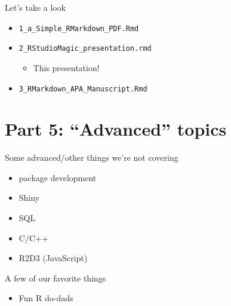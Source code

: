 \documentclass[ignorenonframetext,]{beamer}
\providecommand{\tightlist}{%
  \setlength{\itemsep}{0pt}\setlength{\parskip}{0pt}}
\begin{document}
\begin{frame}[fragile]{Let's take a look}
\protect\hypertarget{lets-take-a-look}{}

\begin{itemize}
\tightlist
\item
  \texttt{1\_a\_Simple\_RMarkdown\_PDF.Rmd}
\item
  \texttt{2\_RStudioMagic\_presentation.rmd}

  \begin{itemize}
  \tightlist
  \item
    This presentation!
  \end{itemize}
\item
  \texttt{3\_RMarkdown\_APA\_Manuscript.Rmd}
\end{itemize}

\end{frame}

\hypertarget{part-5-advanced-topics}{%
\section{Part 5: ``Advanced'' topics}\label{part-5-advanced-topics}}

\begin{frame}{Some advanced/other things we're not covering}
\protect\hypertarget{some-advancedother-things-were-not-covering}{}

\begin{itemize}
\tightlist
\item
  package development
\item
  Shiny
\item
  SQL
\item
  C/C++
\item
  R2D3 (JavaScript)
\end{itemize}

\end{frame}

\begin{frame}{A few of our favorite things}
\protect\hypertarget{a-few-of-our-favorite-things}{}

\begin{itemize}
\tightlist
\item
  Fun R do-dads
\end{itemize}

\end{frame}
\end{document}
